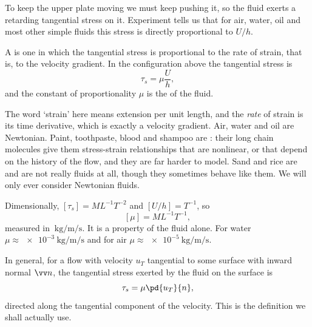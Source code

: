\begin{center}
\end{center}

To keep the upper plate moving we must keep pushing it, so the fluid exerts a retarding tangential stress on it. Experiment tells us that for air, water, oil and most other simple fluids this stress is directly proportional to $U/h$.

\begin{definition}
	A  is one in which the tangential stress is proportional to the rate of strain, that is, to the velocity gradient. In the configuration above the tangential stress is
	$$
	\tau_s = \mu \frac{U}{h},
	$$
	and the constant of proportionality $\mu$ is the  of the fluid.
\end{definition}

The word `strain' here means extension per unit length, and the \emph{rate} of strain is its time derivative, which is exactly a velocity gradient. Air, water and oil are Newtonian. Paint, toothpaste, blood and shampoo are : their long chain molecules give them stress-strain relationships that are nonlinear, or that depend on the history of the flow, and they are far harder to model. Sand and rice are  and are not really fluids at all, though they sometimes behave like them. We will only ever consider Newtonian fluids.

Dimensionally, $[\tau_s] = M L^{-1} T^{-2}$ and $[U/h] = T^{-1}$, so
$$
[\mu] = M L^{-1} T^{-1},
$$
measured in $\SI{}{\kilo\gram\per\meter\per\second}$. It is a property of the fluid alone. For water $\mu \approx \SI{e-3}{\kilo\gram\per\meter\per\second}$ and for air $\mu \approx \SI{e-5}{\kilo\gram\per\meter\per\second}$.

In general, for a flow with velocity $u_T$ tangential to some surface with inward normal $\vv n$, the tangential stress exerted by the fluid on the surface is
$$
\tau_s = \mu \pd{u_T}{n},
$$
directed along the tangential component of the velocity. This is the definition we shall actually use.

